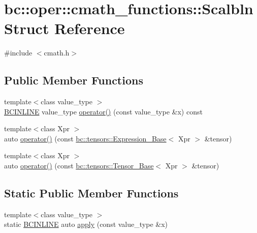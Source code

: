 \hypertarget{structbc_1_1oper_1_1cmath__functions_1_1Scalbln}{}\section{bc\+:\+:oper\+:\+:cmath\+\_\+functions\+:\+:Scalbln Struct Reference}
\label{structbc_1_1oper_1_1cmath__functions_1_1Scalbln}


{\ttfamily \#include $<$cmath.\+h$>$}

\subsection*{Public Member Functions}
\begin{DoxyCompactItemize}
\item 
{\footnotesize template$<$class value\+\_\+type $>$ }\\\hyperlink{common_8h_a6699e8b0449da5c0fafb878e59c1d4b1}{B\+C\+I\+N\+L\+I\+NE} value\+\_\+type \hyperlink{structbc_1_1oper_1_1cmath__functions_1_1Scalbln_a52327692a9163cae6a4213d02ad947e8}{operator()} (const value\+\_\+type \&x) const
\item 
{\footnotesize template$<$class Xpr $>$ }\\auto \hyperlink{structbc_1_1oper_1_1cmath__functions_1_1Scalbln_a2d70ab46da9ee411a529a5fe55aef11f}{operator()} (const \hyperlink{classbc_1_1tensors_1_1Expression__Base}{bc\+::tensors\+::\+Expression\+\_\+\+Base}$<$ Xpr $>$ \&tensor)
\item 
{\footnotesize template$<$class Xpr $>$ }\\auto \hyperlink{structbc_1_1oper_1_1cmath__functions_1_1Scalbln_ab3fdf7e572fa60f2a37a525838587866}{operator()} (const \hyperlink{classbc_1_1tensors_1_1Tensor__Base}{bc\+::tensors\+::\+Tensor\+\_\+\+Base}$<$ Xpr $>$ \&tensor)
\end{DoxyCompactItemize}
\subsection*{Static Public Member Functions}
\begin{DoxyCompactItemize}
\item 
{\footnotesize template$<$class value\+\_\+type $>$ }\\static \hyperlink{common_8h_a6699e8b0449da5c0fafb878e59c1d4b1}{B\+C\+I\+N\+L\+I\+NE} auto \hyperlink{structbc_1_1oper_1_1cmath__functions_1_1Scalbln_af15898d12c1129b5eb2617327465e4bd}{apply} (const value\+\_\+type \&x)
\end{DoxyCompactItemize}


